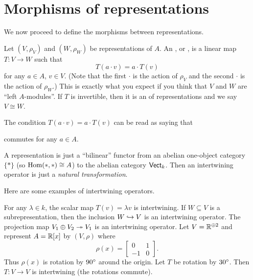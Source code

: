 \section{Morphisms of representations}
We now proceed to define the morphisms between representations.

\begin{definition}
	Let $(V, \rho_V)$ and $(W, \rho_W)$ be representations of $A$.
	An , or , is a
	linear map $T \colon V \to W$ such that
	\[ T(a \cdot v) = a \cdot T(v) \]
	for any $a \in A$, $v \in V$.
	(Note that the first $\cdot$ is the action of $\rho_V$
	and the second $\cdot$ is the action of $\rho_W$.)
	This is exactly what you expect if you think that $V$ and $W$
	are ``left $A$-modules''.
	If $T$ is invertible, then it is an  of representations
	and we say $V \cong W$.
\end{definition}
\begin{remark}
	The condition $T(a \cdot v) = a \cdot T(v)$ can be read as saying that
	\begin{center}
	\end{center}
	commutes for any $a \in A$.
\end{remark}

\begin{remark}
	A representation is just a ``bilinear'' functor from an
	abelian one-object category $\{\ast\}$ (so $\operatorname{Hom}(\ast, \ast) \cong A$)
	to the abelian category $\mathsf{Vect}_k$.
	Then an intertwining operator is just a \emph{natural transformation}.
\end{remark}

Here are some examples of intertwining operators.
\begin{example}
	\listhack
	\begin{enumerate}[(a)]
		\ii For any $\lambda \in k$, the scalar map $T(v) = \lambda v$
		is intertwining.
		\ii If $W \subseteq V$ is a subrepresentation,
		then the inclusion $W \hookrightarrow V$ is an intertwining operator.
		\ii The projection map $V_1 \oplus V_2 \twoheadrightarrow V_1$
		is an intertwining operator.
		\ii Let $V  = \mathbb R^{\oplus 2}$ and represent $A = \mathbb R[x]$ by $(V, \rho)$ where
		\[ \rho(x) = \begin{bmatrix} 0 & 1 \\ -1 & 0 \end{bmatrix}. \]
		Thus $\rho(x)$ is rotation by $90^\circ$ around the origin.
		Let $T$ be rotation by $30^\circ$.
		Then $T \colon V \to V$ is intertwining (the rotations commute).
	\end{enumerate}
\end{example}

